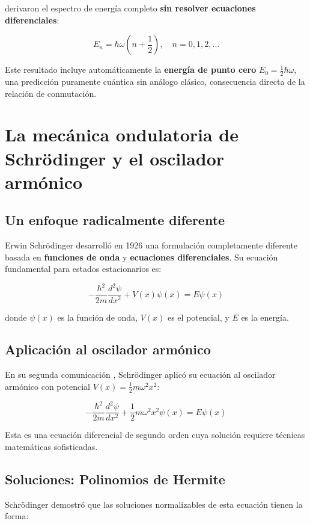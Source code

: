 \documentclass[11pt,a4paper,spanish]{book}
\begin{document}
derivaron el espectro de energía completo \textbf{sin resolver ecuaciones diferenciales}:

\[
E_n = \hbar\omega\left(n + \frac{1}{2}\right), \quad n = 0, 1, 2, \ldots
\]

Este resultado incluye automáticamente la \textbf{energía de punto cero} $E_0 = \frac{1}{2}\hbar\omega$, una predicción puramente cuántica sin análogo clásico, consecuencia directa de la relación de conmutación.


\section{La mecánica ondulatoria de Schrödinger y el oscilador armónico} \label{sec:schrodinger}

\subsection*{Un enfoque radicalmente diferente}

Erwin Schrödinger desarrolló en 1926 una formulación completamente diferente basada en \textbf{funciones de onda} y \textbf{ecuaciones diferenciales}. Su ecuación fundamental para estados estacionarios es:

\[
-\frac{\hbar^2}{2m}\frac{d^2\psi}{dx^2} + V(x)\psi(x) = E\psi(x)
\]

donde $\psi(x)$ es la función de onda, $V(x)$ es el potencial, y $E$ es la energía.

\subsection*{Aplicación al oscilador armónico}

En su segunda comunicación \citep{schrodinger1926b}, Schrödinger aplicó su ecuación al oscilador armónico con potencial $V(x) = \frac{1}{2}m\omega^2 x^2$:

\[
-\frac{\hbar^2}{2m}\frac{d^2\psi}{dx^2} + \frac{1}{2}m\omega^2 x^2 \psi(x) = E\psi(x)
\]

Esta es una ecuación diferencial de segundo orden cuya solución requiere técnicas matemáticas sofisticadas.

\subsection*{Soluciones: Polinomios de Hermite}

Schrödinger demostró que las soluciones normalizables de esta ecuación tienen la forma:
\end{document}
